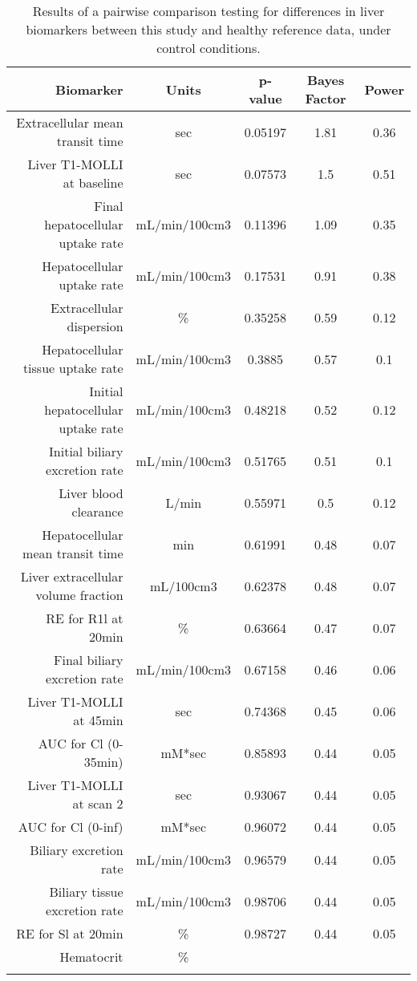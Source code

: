 \documentclass{epflreport}%
\begin{document}
%
\begin{longtable}{rcccc}%
\hline%
Biomarker&Units&p{-}value&Bayes Factor&Power\\%
\hline%
Extracellular mean transit time&sec&0.05197&1.81&0.36\\%
Liver T1{-}MOLLI at baseline&sec&0.07573&1.5&0.51\\%
Final hepatocellular uptake rate&mL/min/100cm3&0.11396&1.09&0.35\\%
Hepatocellular uptake rate&mL/min/100cm3&0.17531&0.91&0.38\\%
Extracellular dispersion&\%&0.35258&0.59&0.12\\%
Hepatocellular tissue uptake rate&mL/min/100cm3&0.3885&0.57&0.1\\%
Initial hepatocellular uptake rate&mL/min/100cm3&0.48218&0.52&0.12\\%
Initial biliary excretion rate&mL/min/100cm3&0.51765&0.51&0.1\\%
Liver blood clearance&L/min&0.55971&0.5&0.12\\%
Hepatocellular mean transit time&min&0.61991&0.48&0.07\\%
Liver extracellular volume fraction&mL/100cm3&0.62378&0.48&0.07\\%
RE for R1l at 20min&\%&0.63664&0.47&0.07\\%
Final biliary excretion rate&mL/min/100cm3&0.67158&0.46&0.06\\%
Liver T1{-}MOLLI at 45min&sec&0.74368&0.45&0.06\\%
AUC for Cl (0{-}35min)&mM*sec&0.85893&0.44&0.05\\%
Liver T1{-}MOLLI at scan 2&sec&0.93067&0.44&0.05\\%
AUC for Cl (0{-}inf)&mM*sec&0.96072&0.44&0.05\\%
Biliary excretion rate&mL/min/100cm3&0.96579&0.44&0.05\\%
Biliary tissue excretion rate&mL/min/100cm3&0.98706&0.44&0.05\\%
RE for Sl at 20min&\%&0.98727&0.44&0.05\\%
Hematocrit&\%&&&\\%
\hline%
\caption{Results of a pairwise comparison testing for differences in liver biomarkers between this study and healthy reference data, under control conditions.} \\%
\end{longtable}%
\end{document}
